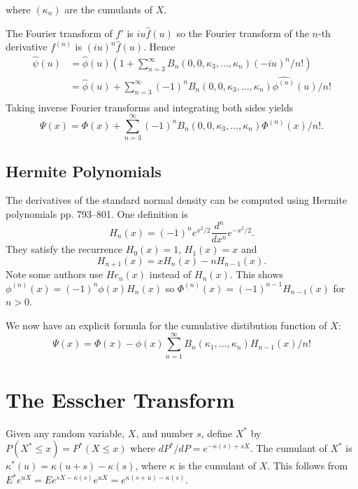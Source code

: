 \documentclass[fleqn]{amsart}
\theoremstyle{definition}
\begin{document}
where \((\kappa_n)\) are the cumulants of \(X\).

The Fourier transform of \(f'\) is \(iu \hat f(u)\) so
the Fourier transform of the \(n\)-th derivative
\(f^{(n)}\) is \((iu)^n\hat f(u)\). Hence
\begin{align*}
\hat{\psi}(u) &= \hat{\phi}(u)(1 + \sum_{n=3}^\infty B_n(0, 0,\kappa_3,...,\kappa_n) (-iu)^n/n!)\\
	&= \hat{\phi}(u) + \sum_{n=3}^\infty (-1)^n B_n(0, 0, \kappa_3,...,\kappa_n)
	\widehat{\phi^{(n)}}(u)/n!\\
\end{align*}
Taking inverse Fourier transforms and integrating both
sides yields
\begin{equation}
	\Psi(x) = \Phi(x) + \sum_{n=3}^\infty (-1)^n B_n(0,0,\kappa_3,...,\kappa_n) \Phi^{(n)}(x)/n!.
\end{equation}

\subsection{Hermite Polynomials}
The derivatives of the standard normal density 
can be computed using Hermite polynomials\cite{AbrSte1964}
pp. 793--801.
One definition is
\[
H_n(x) = (-1)^n e^{x^2/2}\frac{d^n}{dx^n}e^{-x^2/2}.
\]
They satisfy the recurrence \(H_0(x) = 1\), \(H_1(x) = x\) and
\[
H_{n+1}(x) = xH_n(x) - n H_{n-1}(x).
\]
Note some authors use \(He_n(x)\) instead of \(H_n(x)\).
This shows \(\phi^{(n)}(x) = (-1)^n\phi(x) H_n(x)\)
so \(\Phi^{(n)}(x) = (-1)^{n-1} H_{n-1}(x)\) for \(n > 0\).

We now have an explicit formula for the cumulative
distibution function of \(X\):
\begin{equation}
\Psi(x) = \Phi(x) - \phi(x)\sum_{n=1}^\infty
B_n(\kappa_1,\dots,\kappa_n) H_{n-1}(x)/n!
\end{equation}

\section{The Esscher Transform}

Given any random variable, \(X\), and number \(s\), define
\(X^*\) by \(P(X^*\le x) = P^*(X\le x)\) where
\(dP^*/dP = e^{-\kappa(s) + sX}\).
The cumulant of \(X^*\) is \(\kappa^*(u) = \kappa(u + s) - \kappa(s)\),
where \(\kappa\) is the cumulant of \(X\).
This follows from \(E^* e^{uX} = Ee^{sX - \kappa(s)} e^{uX}
= e^{\kappa(s + u) - \kappa(s)}\).
\end{document}
